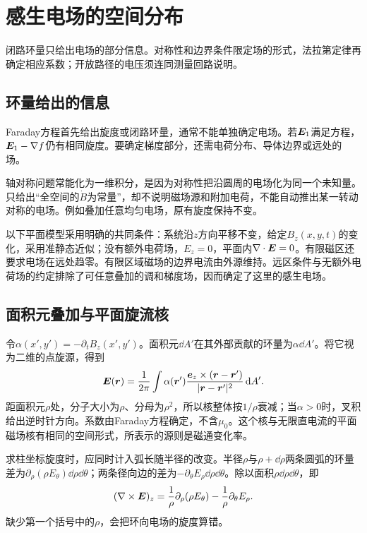 \section{感生电场的空间分布}\label{sec:i1-symmetry}
闭路环量只给出电场的部分信息。对称性和边界条件限定场的形式，法拉第定律再确定相应系数；开放路径的电压须连同测量回路说明。

\subsection{环量给出的信息}
Faraday方程首先给出旋度或闭路环量，通常不能单独确定电场。若$\bm{E}_1$满足方程，$\bm{E}_1-\nabla f$仍有相同旋度。要确定梯度部分，还需电荷分布、导体边界或远处的场。

轴对称问题常能化为一维积分，是因为对称性把沿圆周的电场化为同一个未知量。只给出“全空间的$\dot B$为常量”，却不说明磁场源和附加电荷，不能自动推出某一转动对称的电场。例如叠加任意均匀电场，原有旋度保持不变。

以下平面模型采用明确的共同条件：系统沿$z$方向平移不变，给定$B_z(x,y,t)$的变化，采用准静态近似；没有额外电荷场，$E_z=0$，平面内$\nabla\cdot\bm{E}=0$。有限磁区还要求电场在远处趋零。有限区域磁场的边界电流由外源维持。远区条件与无额外电荷场的约定排除了可任意叠加的调和梯度场，因而确定了这里的感生电场。

\subsection{面积元叠加与平面旋流核}
令$\alpha(x',y')=-\partial_tB_z(x',y')$。面积元$\dd A'$在其外部贡献的环量为$\alpha\dd A'$。将它视为二维的点旋源，得到
\begin{equation}\label{eq:i1-area-kernel}
\bm{E}(\bm{r})=\frac1{2\pi}\int
\alpha(\bm{r}')\frac{\bm{e}_z\times(\bm{r}-\bm{r}')}{|\bm{r}-\bm{r}'|^2}\mathop{}\!\mathrm d A'.
\end{equation}
距面积元$\rho$处，分子大小为$\rho$、分母为$\rho^2$，所以核整体按$1/\rho$衰减；当$\alpha>0$时，叉积给出逆时针方向。系数由Faraday方程确定，不含$\mu_0$。这个核与无限直电流的平面磁场核有相同的空间形式，所表示的源则是磁通变化率。

求柱坐标旋度时，应同时计入弧长随半径的改变。半径$\rho$与$\rho+\dd\rho$两条圆弧的环量差为$\partial_\rho(\rho E_\theta)\dd\rho\dd\theta$；两条径向边的差为$-\partial_\theta E_\rho\dd\rho\dd\theta$。除以面积$\rho\dd\rho\dd\theta$，即
\[(\nabla\times\bm{E})_z
=\frac1\rho\partial_\rho(\rho E_\theta)-\frac1\rho\partial_\theta E_\rho.
\]
缺少第一个括号中的$\rho$，会把环向电场的旋度算错。


